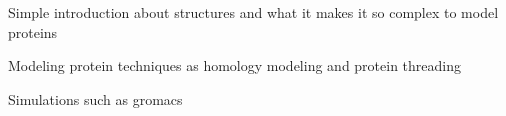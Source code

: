 Simple introduction about structures and what it makes it so complex to model proteins

Modeling protein techniques as homology modeling and protein threading

Simulations such as gromacs 
